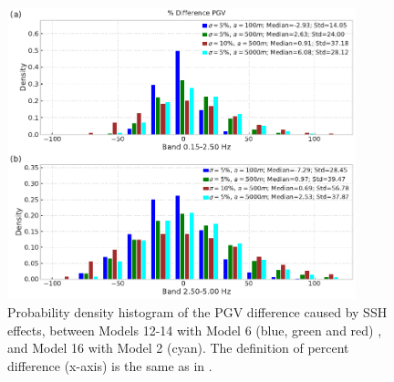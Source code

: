 \begin{figure}[!ht]
  \centering
  \includegraphics[width=0.9\textwidth,height=0.9\textheight,keepaspectratio]{figures/figure_highf_S5.pdf}
  \caption{Probability density histogram of the PGV difference caused by SSH effects, between Models 12-14 with Model 6 (blue, green and red) , and Model 16 with Model 2 (cyan). The definition of percent difference (x-axis) is the same as in .
  }
  \label{fig:highf-S5}
\end{figure}
\clearpage

